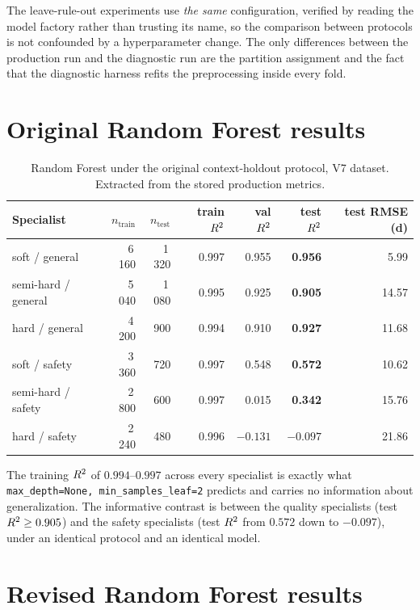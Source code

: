 The leave-rule-out experiments use \emph{the same} configuration, verified
by reading the model factory rather than trusting its name, so the
comparison between protocols is not confounded by a hyperparameter change.
The only differences between the production run and the diagnostic run are
the partition assignment and the fact that the diagnostic harness refits
the preprocessing inside every fold.

\section{Original Random Forest results}

\begin{table}[htbp]\centering\small
\caption{Random Forest under the original context-holdout protocol, V7
dataset. Extracted from the stored production metrics.}
\label{tab:rf_original}
\begin{tabular}{lrrrrrr}
\toprule
Specialist & $n_{\text{train}}$ & $n_{\text{test}}$ & train $R^2$ & val $R^2$ & test $R^2$ & test RMSE (d) \\
\midrule
soft / general & 6\,160 & 1\,320 & 0.997 & 0.955 & \textbf{0.956} & 5.99 \\
semi-hard / general & 5\,040 & 1\,080 & 0.995 & 0.925 & \textbf{0.905} & 14.57 \\
hard / general & 4\,200 & 900 & 0.994 & 0.910 & \textbf{0.927} & 11.68 \\
soft / safety & 3\,360 & 720 & 0.997 & 0.548 & \textbf{0.572} & 10.62 \\
semi-hard / safety & 2\,800 & 600 & 0.997 & 0.015 & \textbf{0.342} & 15.76 \\
hard / safety & 2\,240 & 480 & 0.996 & $-0.131$ & \textbf{$-0.097$} & 21.86 \\
\bottomrule
\end{tabular}
\end{table}

The training $R^2$ of $0.994$--$0.997$ across every specialist is exactly
what \texttt{max\_depth=None, min\_samples\_leaf=2} predicts and carries no
information about generalization. The informative contrast is between the
quality specialists (test $R^2 \ge 0.905$) and the safety specialists
(test $R^2$ from $0.572$ down to $-0.097$), under an identical protocol
and an identical model.

\section{Revised Random Forest results}

